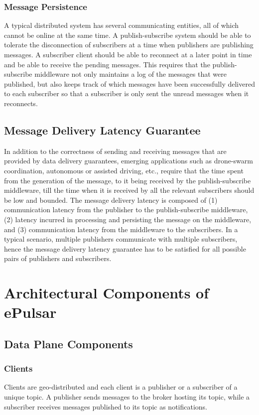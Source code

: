 \subsubsection{Message Persistence}
A typical distributed system has several communicating entities, all of which cannot be online at the same time. A publish-subscribe system should be able to tolerate the disconnection of subscribers at a time when publishers are publishing messages. A subscriber client should be able to reconnect at a later point in time and be able to receive the pending messages. This requires that the publish-subscribe middleware not only maintains a log of the messages that were published, but also keeps track of which messages have been successfully delivered to each subscriber so that a subscriber is only sent the unread messages when it reconnects.
\subsection{Message Delivery Latency Guarantee}
In addition to the correctness of sending and receiving messages that are provided by data delivery guarantees, emerging applications such as drone-swarm coordination, autonomous or assisted driving, etc., require that the time spent from the generation of the message, to it being received by the publish-subscribe middleware, till the time when it is received by all the relevant subscribers should be low and bounded. The message delivery latency is composed of (1) communication latency from the publisher to the publish-subscribe middleware, (2) latency incurred in processing and persisting the message on the middleware, and (3) communication latency from the middleware to the subscribers. In a typical scenario, multiple publishers communicate with multiple subscribers, hence the message delivery latency guarantee has to be satisfied for all possible pairs of publishers and subscribers.

\section{Architectural Components of ePulsar}
\subsection{Data Plane Components}
\subsubsection{Clients}
Clients are geo-distributed and each client is a publisher or a subscriber of a unique topic. A publisher sends messages to the broker hosting its topic, while a subscriber receives messages published to its topic as notifications.
